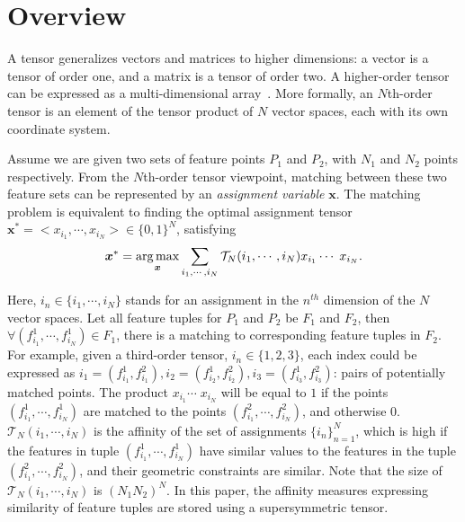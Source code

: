 \section{Overview}
\label{sec:overview}

A tensor generalizes vectors and matrices to higher dimensions: a vector is a tensor of order one,
and a matrix is a tensor of order two. A higher-order tensor can be expressed as a multi-dimensional array~\cite{Kolda08}.
More formally, an $N$th-order tensor is an element of the tensor product of $N$ vector spaces, each with its own coordinate system.

Assume we are given two sets of feature points $P_1$ and $P_2$, with $N_1$ and $N_2$ points respectively.
From the $N$th-order tensor viewpoint, matching between these two feature sets can be represented by an \emph{assignment variable} $\boldsymbol{x}$.
The matching problem is equivalent to finding the optimal assignment tensor ${\boldsymbol{x}}^*=<x_{i_1},\cdots,x_{i_N}>
 \in \{0,1\}^{N}$, satisfying~\cite{Kolda08,Duchenne09}
\begin{equation}
\label{equ:assigment}
  {\boldsymbol{x}}^* = \operatorname*{arg\,max}_{\boldsymbol{x}}  \sum_{i_1,\cdots,i_N} \mathcal{T}_N(i_1,\cdots,i_N) x_{i_1}  \cdots\; x_{i_N}.
\end{equation}

Here, $i_n \in \{i_1,\cdots ,i_N\}$ stands for an assignment in the $n^{th}$ dimension of the $N$ vector spaces.
Let all feature tuples for $P_1$ and $P_2$ be $F_1$ and $F_2$, then $\forall (f_{i_1}^1, \cdots, f_{i_N}^1)\in F_1$,
there is a matching to corresponding feature tuples in $F_2$.
For example, given a third-order tensor, $i_n \in \{1,2,3\}$,
each index could be expressed as $i_1=(f_{i_1}^1,f_{i_1}^2), i_2=(f_{i_2}^1,f_{i_2}^2), i_3=(f_{i_3}^1,f_{i_3}^2)$: pairs of potentially matched points.
The product $x_{i_1} \cdots\;x_{i_N}$ will be equal to $1$ if the points $(f_{i_1}^1, \cdots, f_{i_N}^1)$ are matched to the points $(f_{i_1}^2, \cdots, f_{i_N}^2)$,
and otherwise 0.
$\mathcal{T}_N(i_1,\cdots,i_N)$ is the affinity of the set of assignments $\{i_n\}_{n=1}^N$,
which is high if the features in tuple $(f_{i_1}^1, \cdots, f_{i_N}^1)$  have similar values to the features in the tuple $(f_{i_1}^2, \cdots, f_{i_N}^2)$, 
and their geometric constraints are similar.
Note that the size of $\mathcal{T}_N(i_1,\cdots,i_N)$ is ${(N_1N_2)}^N$.
In this paper, the affinity measures expressing similarity of feature tuples are stored using a supersymmetric tensor.

